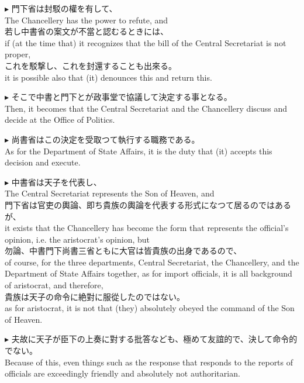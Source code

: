 \documentclass{ctexart}
\makeatletter
\newcommand*{\shifttext}[1]{%
  \settowidth{\@tempdima}{#1}%
  \hspace{-\@tempdima}#1%
}
\newcommand{\plabel}[1]{%
\shifttext{\textbf{#1}\quad}%
}
\makeatother
\begin{document}
\vspace{1em}
\plabel{$\blacktriangleright$}%
門下省は封駁の權を有して、\\
The Chancellery has the power to refute, and\\
若し中書省の案文が不當と認むるときには、\\
if (at the time that) it recognizes that the bill of the Central Secretariat is not proper,\\
これを駁撃し、これを封還することも出來る。\\
it is possible also that (it) denounces this and return this.

\vspace{1em}
\plabel{$\blacktriangleright$}%
そこで中書と門下とが政事堂で協議して決定する事となる。\\
Then, it becomes that the Central Secretariat and the Chancellery discuss and decide at the Office of Politics.

\vspace{1em}
\plabel{$\blacktriangleright$}%
尚書省はこの決定を受取つて執行する職務である。\\
As for the Department of State Affairs, it is the duty that (it) accepts this decision and execute.

\vspace{1em}
\plabel{$\blacktriangleright$}%
中書省は天子を代表し、\\
The Central Secretariat represents the Son of Heaven, and\\
門下省は官吏の輿論、即ち貴族の輿論を代表する形式になつて居るのではあるが、\\
it exists that the Chancellery has become the form that represents the official's opinion, i.e. the aristocrat's opinion, but\\
勿論、中書\textperiodcentered 門下\textperiodcentered 尚書三省ともに大官は皆貴族の出身であるので、\\
of course, for the three departments, Central Secretariat, the Chancellery, and the Department of State Affairs together, as for import officials, it is all background of aristocrat, and therefore,\\
貴族は天子の命令に絶對に服從したのではない。\\
as for aristocrat, it is not that (they) absolutely obeyed the command of the Son of Heaven.

\vspace{1em}
\plabel{$\blacktriangleright$}%
夫故に天子が臣下の上奏に對する批答なども、極めて友誼的で、決して命令的でない。\\
Because of this, even things such as the response that responds to the reports of officials are exceedingly friendly and absolutely not authoritarian.
\end{document}
